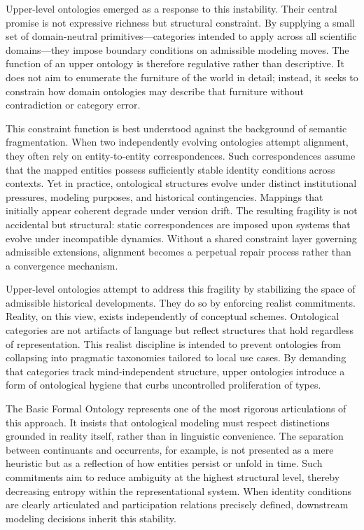 \documentclass[12pt]{article}
\begin{document}
Upper-level ontologies emerged as a response to this instability. Their central promise is not expressive richness but structural constraint. By supplying a small set of domain-neutral primitives—categories intended to apply across all scientific domains—they impose boundary conditions on admissible modeling moves. The function of an upper ontology is therefore regulative rather than descriptive. It does not aim to enumerate the furniture of the world in detail; instead, it seeks to constrain how domain ontologies may describe that furniture without contradiction or category error.

This constraint function is best understood against the background of semantic fragmentation. When two independently evolving ontologies attempt alignment, they often rely on entity-to-entity correspondences. Such correspondences assume that the mapped entities possess sufficiently stable identity conditions across contexts. Yet in practice, ontological structures evolve under distinct institutional pressures, modeling purposes, and historical contingencies. Mappings that initially appear coherent degrade under version drift. The resulting fragility is not accidental but structural: static correspondences are imposed upon systems that evolve under incompatible dynamics. Without a shared constraint layer governing admissible extensions, alignment becomes a perpetual repair process rather than a convergence mechanism.

Upper-level ontologies attempt to address this fragility by stabilizing the space of admissible historical developments. They do so by enforcing realist commitments. Reality, on this view, exists independently of conceptual schemes. Ontological categories are not artifacts of language but reflect structures that hold regardless of representation. This realist discipline is intended to prevent ontologies from collapsing into pragmatic taxonomies tailored to local use cases. By demanding that categories track mind-independent structure, upper ontologies introduce a form of ontological hygiene that curbs uncontrolled proliferation of types.

The Basic Formal Ontology represents one of the most rigorous articulations of this approach. It insists that ontological modeling must respect distinctions grounded in reality itself, rather than in linguistic convenience. The separation between continuants and occurrents, for example, is not presented as a mere heuristic but as a reflection of how entities persist or unfold in time. Such commitments aim to reduce ambiguity at the highest structural level, thereby decreasing entropy within the representational system. When identity conditions are clearly articulated and participation relations precisely defined, downstream modeling decisions inherit this stability.
\end{document}
